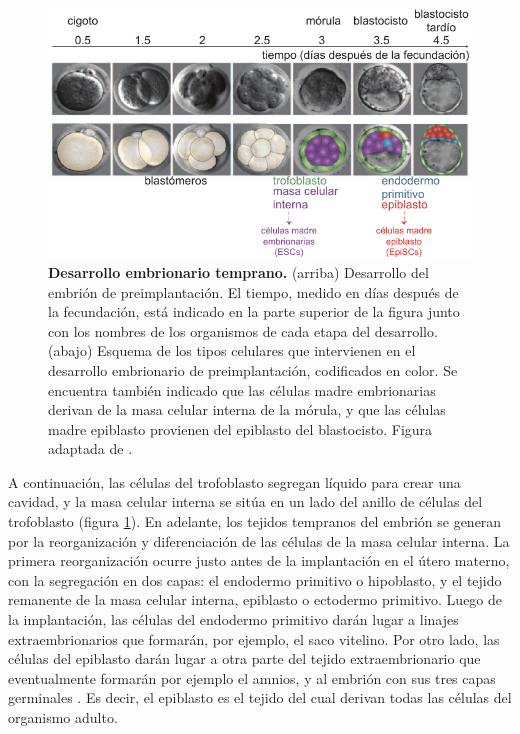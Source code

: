 \documentclass[./main.tex]{subfiles}
\begin{document}
\begin{figure}
    \centering
    \includegraphics[width=1\columnwidth]{figures/chapter1/C1_des_emb_temprano.pdf} 
    \caption{\textbf{Desarrollo embrionario temprano.} (arriba) Desarrollo del embrión de preimplantación. El tiempo, medido en días después de la fecundación, está indicado en la parte superior de la figura junto con los nombres de los organismos de cada etapa del desarrollo. (abajo) Esquema de los tipos celulares que intervienen en el desarrollo embrionario de preimplantación, codificados en color. Se encuentra también indicado que las células madre embrionarias derivan de la masa celular interna de la mórula, y que las células madre epiblasto provienen del epiblasto del blastocisto. Figura adaptada de \cite{Schrode2013}.}
    \label{C1_fig:des_emb_temprano}
\end{figure}

A continuación, las células del trofoblasto segregan líquido para crear una cavidad, y la masa celular interna se sitúa en un lado del anillo de células del trofoblasto  (figura \ref{C1_fig:des_emb_temprano}). En adelante, los tejidos tempranos del embrión se generan por la reorganización y diferenciación de las células de la masa celular interna. La primera reorganización ocurre justo antes de la implantación en el útero materno, con la segregación en dos capas: el endodermo primitivo o hipoblasto, y el tejido remanente de la masa celular interna, epiblasto o ectodermo primitivo. Luego de la implantación, las células del endodermo primitivo darán lugar a linajes extraembrionarios que formarán, por ejemplo, el saco vitelino. Por otro lado, las células del epiblasto darán lugar a otra parte del tejido extraembrionario que eventualmente formarán por ejemplo el amnios, y al embrión con sus tres capas germinales \cite{Beddington1999,Nakamura2016,Gardner1983}. Es decir, el epiblasto es el tejido del cual derivan todas las células del organismo adulto.
\end{document}

